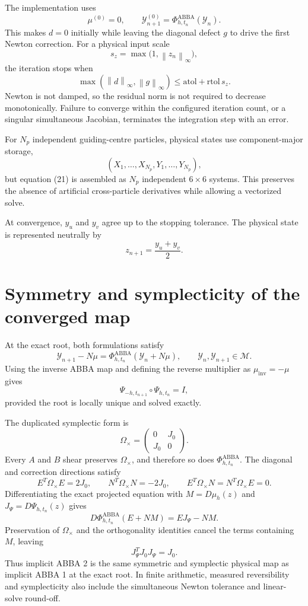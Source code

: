 \documentclass[11pt,a4paper]{article}
\newcommand{\Id}{I}
\newcommand{\Y}{\mathcal{Y}}
\newcommand{\M}{\mathcal{M}}
\newcommand{\Om}{\Omega_{\times}}
\newcommand{\PhiAB}{\Phi^{\mathrm{ABBA}}_{h,t_n}}
\newcommand{\norm}[1]{\left\lVert #1\right\rVert}
\begin{document}
The implementation uses
\[
 \mu^{(0)}=0,
 \qquad
 \Y_{n+1}^{(0)}=\PhiAB(\Y_n).
\]
This makes $d=0$ initially while leaving the diagonal defect $g$ to drive the first
Newton correction. For a physical input scale
\[
 s_z=\max\bigl(1,\norm{z_n}_\infty\bigr),
\]
the iteration stops when
\[
 \max\left(\norm{d}_\infty,\norm{g}_\infty\right)
 \leq \text{atol}+\text{rtol}\,s_z.
\]
Newton is not damped, so the residual norm is not required to decrease monotonically.
Failure to converge within the configured iteration count, or a singular simultaneous
Jacobian, terminates the integration step with an error.

For $N_p$ independent guiding-centre particles, physical states use component-major
storage,
\[
 (X_1,\ldots,X_{N_p},Y_1,\ldots,Y_{N_p}),
\]
but equation (21) is assembled as $N_p$ independent $6\times6$ systems. This preserves
the absence of artificial cross-particle derivatives while allowing a vectorized solve.

At convergence, $y_u$ and $y_v$ agree up to the stopping tolerance. The physical state is
represented neutrally by
\[
 z_{n+1}=\frac{y_u+y_v}{2}.
\]

\section{Symmetry and symplecticity of the converged map}

At the exact root, both formulations satisfy
\[
 \Y_{n+1}-N\mu
 =\Phi^{\mathrm{ABBA}}_{h,t_n}(\Y_n+N\mu),
 \qquad
 \Y_n,\Y_{n+1}\in\M.
\]
Using the inverse ABBA map and defining the reverse multiplier as
$\mu_{\mathrm{inv}}=-\mu$ gives
\[
 \Psi_{-h,t_{n+1}}\circ\Psi_{h,t_n}=\Id,
\]
provided the root is locally unique and solved exactly.

The duplicated symplectic form is
\[
 \Om=
 \begin{pmatrix}
  0&J_0\\
  J_0&0
 \end{pmatrix}.
\]
Every $A$ and $B$ shear preserves $\Om$, and therefore so does $\PhiAB$. The
diagonal and correction directions satisfy
\[
 E^T\Om E=2J_0,
 \qquad
 N^T\Om N=-2J_0,
 \qquad
 E^T\Om N=N^T\Om E=0.
\]
Differentiating the exact projected equation with
$M=D\mu_h(z)$ and $J_\Psi=D\Psi_{h,t_n}(z)$ gives
\[
 D\PhiAB(E+NM)=EJ_\Psi-NM.
\]
Preservation of $\Om$ and the orthogonality identities cancel the terms containing
$M$, leaving
\[
 \boxed{J_\Psi^TJ_0J_\Psi=J_0.}
\]
Thus implicit ABBA 2 is the same symmetric and symplectic physical map as implicit
ABBA 1 at the exact root. In finite arithmetic, measured reversibility and symplecticity
also include the simultaneous Newton tolerance and linear-solve round-off.
\end{document}
